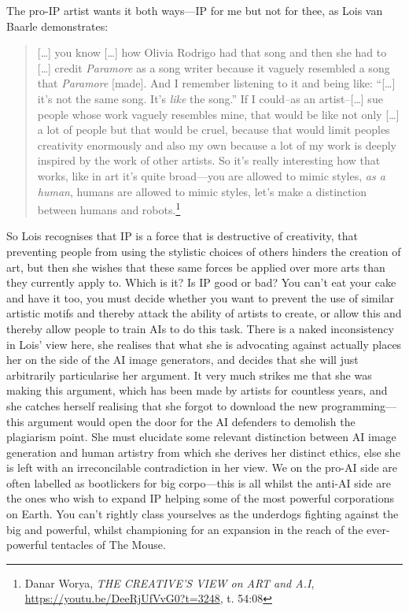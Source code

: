 \documentclass[11pt]{article}
\begin{document}
The pro-IP artist wants it both ways---IP for me but not for thee, as Lois van Baarle demonstrates:
\begin{quote}
[\ldots{}] you know [\ldots{}] how Olivia Rodrigo had that song and then she had to [\ldots{}] credit \emph{Paramore} as a song writer because it vaguely resembled a song that \emph{Paramore} [made]. And I remember listening to it and being like: ``[\ldots{}] it's not the same song. It's \emph{like} the song.'' If I could--as an artist--[\ldots{}] sue people whose work vaguely resembles mine, that would be like not only [\ldots{}] a lot of people but that would be cruel, because that would limit peoples creativity enormously and also my own because a lot of my work is deeply inspired by the work of other artists. So it's really interesting how that works, like in art it's quite broad---you are allowed to mimic styles, \emph{as a human}, humans are allowed to mimic styles, let's make a distinction between humans and robots.\footnote{Danar Worya, \emph{THE CREATIVE'S VIEW on ART and A.I}, \url{https://youtu.be/DeeRjUfVvG0?t=3248}, t. 54:08}
\end{quote}

So Lois recognises that IP is a force that is destructive of creativity, that preventing people from using the stylistic choices of others hinders the creation of art, but then she wishes that these same forces be applied over more arts than they currently apply to. Which is it? Is IP good or bad? You can't eat your cake and have it too, you must decide whether you want to prevent the use of similar artistic motifs and thereby attack the ability of artists to create, or allow this and thereby allow people to train AIs to do this task. There is a naked inconsistency in Lois' view here, she realises that what she is advocating against actually places her on the side of the AI image generators, and decides that she will just arbitrarily particularise her argument. It very much strikes me that she was making this argument, which has been made by artists for countless years, and she catches herself realising that she forgot to download the new programming---this argument would open the door for the AI defenders to demolish the plagiarism point. She must elucidate some relevant distinction between AI image generation and human artistry from which she derives her distinct ethics, else she is left with an irreconcilable contradiction in her view. We on the pro-AI side are often labelled as bootlickers for big corpo---this is all whilst the anti-AI side are the ones who wish to expand IP helping some of the most powerful corporations on Earth. You can't rightly class yourselves as the underdogs fighting against the big and powerful, whilst championing for an expansion in the reach of the ever-powerful tentacles of The Mouse.
\end{document}
